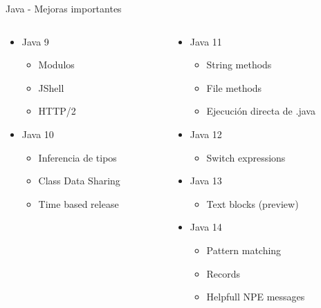 \documentclass[aspectratio=169]{beamer}
\begin{document}
\begin{frame}[fragile]{Java - Mejoras importantes}
\begin{columns}[T]
		\begin{column}[T]{4cm} %
			\begin{itemize}
				\item Java 9
				\begin{itemize}
					\item Modulos
					\item JShell
					\item HTTP/2
				\end{itemize}
				\item Java 10
				\begin{itemize}
					\item Inferencia de tipos
					\item Class Data Sharing
					\item Time based release
				\end{itemize}
			\end{itemize}
		\end{column}
		\begin{column}[T]{6cm} %
			\begin{itemize}
                \item Java 11
                \begin{itemize}
                    \item String methods
                    \item File methods
                    \item Ejecución directa de .java
                \end{itemize}
				\item Java 12
				\begin{itemize}
					\item Switch expressions
				\end{itemize}
				\item Java 13
				\begin{itemize}
					\item Text blocks (preview)
				\end{itemize}
				\item Java 14
				\begin{itemize}
					\item Pattern matching
					\item Records
					\item Helpfull NPE messages
				\end{itemize}
			\end{itemize}
		\end{column}
	\end{columns}
\end{frame}
\end{document}
